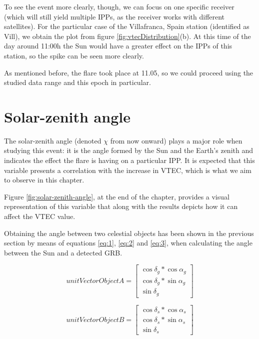 To see the event more clearly, though, we can focus on one specific receiver (which will still yield multiple IPPs, as the receiver works with different satellites). For the particular case of the Villafranca, Spain station (identified as Vill), we obtain the plot from figure \ref{fig:vtecDistribution}(b). At this time of the day around 11:00h the Sun would have a greater effect on the IPPs of this station, so the spike can be seen more clearly. 

As mentioned before, the flare took place at 11.05, so we could proceed using the studied data range and this epoch in particular.

\section{Solar-zenith angle}

The solar-zenith angle (denoted $\chi$ from now onward) plays a major role when studying this event: it is the angle formed by the Sun and the Earth's zenith and indicates the effect the flare is having on a particular IPP. It is expected that this variable presents a correlation with the increase in VTEC, which is what we aim to observe in this chapter.

Figure \ref{fig:solar-zenith-angle}, at the end of the chapter, provides a visual representation of this variable that along with the results depicts how it can affect the VTEC value. 

Obtaining the angle between two celestial objects has been shown in the previous section by means of equations \ref{eq:1}, \ref{eq:2} and \ref{eq:3}, when calculating the angle between the Sun and a detected GRB.

\begin{equation} \label{eq:1}
unitVectorObjectA =	
\begin{bmatrix}
\cos\delta_{g} * \cos\alpha_{g} \\ 
\cos\delta_{g} * \sin\alpha_{g} \\
\sin\delta_{g}
\end{bmatrix}
\end{equation}

\begin{equation} \label{eq:2}
unitVectorObjectB =	
\begin{bmatrix}
\cos\delta_{s} * \cos\alpha_{s} \\ 
\cos\delta_{s} * \sin\alpha_{s} \\
\sin\delta_{s}
\end{bmatrix}
\end{equation}

